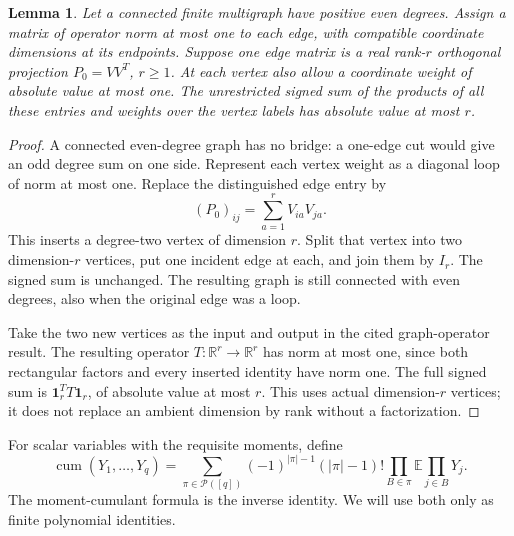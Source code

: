 \documentclass[11pt]{article}
\newtheorem{lemma}[theorem]{Lemma}
\theoremstyle{definition}
\newcommand{\E}{\mathbb E}
\newcommand{\R}{\mathbb R}
\newcommand{\one}{\mathbf 1}
\DeclareMathOperator{\cum}{cum}
\begin{document}
\begin{lemma}\label{lem:graph}
Let a connected finite multigraph have positive even degrees. Assign
a matrix of operator norm at most one to each edge, with compatible
coordinate dimensions at its endpoints. Suppose one edge matrix is a
real rank-\(r\) orthogonal projection \(P_0=VV^T\), \(r\ge1\).
At each vertex also allow a coordinate weight of absolute value at most
one. The unrestricted signed sum of the products of all these entries
and weights over the vertex labels has absolute value at most \(r\).
\end{lemma}
\begin{proof}
A connected even-degree graph has no bridge: a one-edge cut would give
an odd degree sum on one side. Represent each vertex weight as a
diagonal loop of norm at most one. Replace the distinguished edge
entry by
\[
 (P_0)_{ij}=\sum_{a=1}^r V_{ia}V_{ja}.
\]
This inserts a degree-two vertex of dimension \(r\). Split that vertex
into two dimension-\(r\) vertices, put one incident edge at each, and
join them by \(I_r\). The signed sum is unchanged. The resulting graph
is still connected with even degrees, also when the original edge was
a loop.

Take the two new vertices as the input and output in the cited
graph-operator result. The resulting operator \(T:\R^r\to\R^r\) has
norm at most one, since both rectangular factors and every inserted
identity have norm one. The full signed sum is
\(\one_r^T T\one_r\), of absolute value at most \(r\).
This uses actual dimension-\(r\) vertices; it does not replace an
ambient dimension by rank without a factorization.
\end{proof}

For scalar variables with the requisite moments, define
\[
 \cum(Y_1,\ldots,Y_q)=
 \sum_{\pi\in\mathcal P([q])}(-1)^{|\pi|-1}(|\pi|-1)!
                       \prod_{B\in\pi}\E\prod_{j\in B}Y_j.       \tag{4}
\]
The moment-cumulant formula is the inverse identity.
We will use both only as finite polynomial identities.
\end{document}
